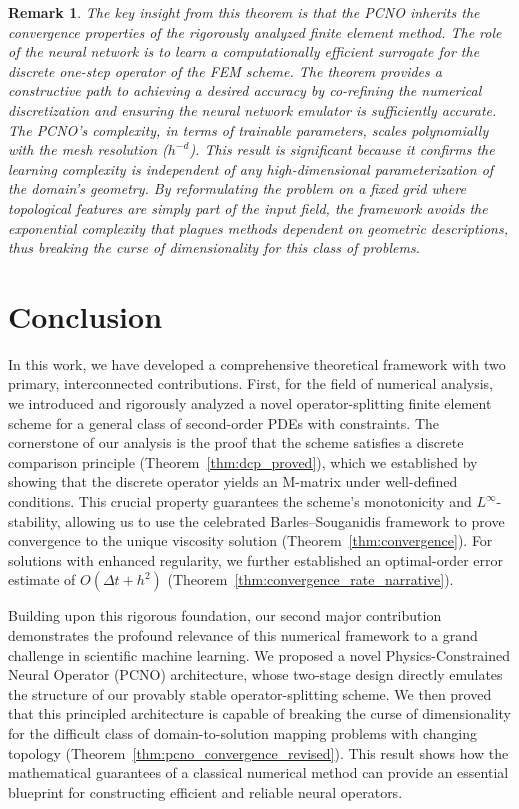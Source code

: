 \documentclass[pdflatex,sn-mathphys-num]{sn-jnl}%
\theoremstyle{thmstyleone}%
\newtheorem{rmk}{Remark}[section]
\numberwithin{equation}{section}
\begin{document}
\begin{rmk}
The key insight from this theorem is that the PCNO inherits the convergence properties of the rigorously analyzed finite element method. The role of the neural network is to learn a computationally efficient surrogate for the discrete one-step operator of the FEM scheme. The theorem provides a constructive path to achieving a desired accuracy by co-refining the numerical discretization and ensuring the neural network emulator is sufficiently accurate. The PCNO's complexity, in terms of trainable parameters, scales polynomially with the mesh resolution ($h^{-d}$). This result is significant because it confirms the learning complexity is independent of any high-dimensional parameterization of the domain's geometry. By reformulating the problem on a fixed grid where topological features are simply part of the input field, the framework avoids the exponential complexity that plagues methods dependent on geometric descriptions, thus breaking the curse of dimensionality for this class of problems.
\end{rmk}




\section{Conclusion}
\label{sec:conclusion}


In this work, we have developed a comprehensive theoretical framework with two primary, interconnected contributions. First, for the field of numerical analysis, we introduced and rigorously analyzed a novel operator-splitting finite element scheme for a general class of second-order PDEs with constraints. The cornerstone of our analysis is the proof that the scheme satisfies a discrete comparison principle (Theorem~\ref{thm:dcp_proved}), which we established by showing that the discrete operator yields an M-matrix under well-defined conditions. This crucial property guarantees the scheme’s monotonicity and $L^\infty$-stability, allowing us to use the celebrated Barles--Souganidis framework to prove convergence to the unique viscosity solution (Theorem~\ref{thm:convergence}). For solutions with enhanced regularity, we further established an optimal-order error estimate of $O(\Delta t + h^2)$ (Theorem~\ref{thm:convergence_rate_narrative}).

Building upon this rigorous foundation, our second major contribution demonstrates the profound relevance of this numerical framework to a grand challenge in scientific machine learning. We proposed a novel Physics-Constrained Neural Operator (PCNO) architecture, whose two-stage design directly emulates the structure of our provably stable operator-splitting scheme. We then proved that this principled architecture is capable of breaking the curse of dimensionality for the difficult class of domain-to-solution mapping problems with changing topology (Theorem~\ref{thm:pcno_convergence_revised}). This result shows how the mathematical guarantees of a classical numerical method can provide an essential blueprint for constructing efficient and reliable neural operators.
\end{document}
